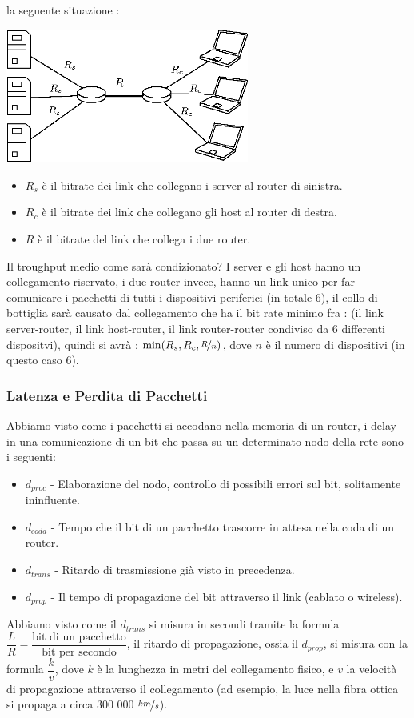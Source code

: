 \documentclass[12pt, letterpaper]{article}
\begin{document}
la seguente situazione :\begin{center}
    \includegraphics[width=0.6\textwidth ]{images/troughput.eps}
\end{center}\begin{itemize}
    \item $R_s$ è il bitrate dei link che collegano i server al router di sinistra.
    \item $R_c$ è il bitrate dei link che collegano gli host al router di destra.
    \item $R$ è il bitrate del link che collega i due router.
\end{itemize}
Il troughput medio come sarà condizionato? I server e gli host hanno un collegamento riservato, i due router 
invece, hanno un link unico per far comunicare i pacchetti di tutti i dispositivi periferici (in totale 6),
il collo di bottiglia sarà causato dal collegamento che ha il bit rate minimo fra : (il link server-router, il link 
host-router, il link router-router condiviso da 6 differenti dispositvi), quindi si avrà : $\min(R_s,R_c,\nicefrac{R}{n})$, dove 
$n$ è il numero di dispositivi (in questo caso 6).
\subsubsection{Latenza e Perdita di Pacchetti}
Abbiamo visto come i pacchetti si accodano nella memoria di un router, i delay in una comunicazione di un bit 
che passa su un determinato nodo della rete sono i seguenti: 
\begin{itemize}
    \item $d_{proc}$ - Elaborazione del nodo, controllo di possibili errori sul bit, solitamente ininfluente.
    \item $d_{coda}$ - Tempo che il bit di un pacchetto trascorre in attesa nella coda di un router.
    \item $d_{trans}$ - Ritardo di trasmissione già visto in precedenza.
    \item $d_{prop}$ - Il tempo di propagazione del bit attraverso il link (cablato o wireless).
\end{itemize}
Abbiamo visto come il $d_{trans}$ si misura in secondi tramite la formula
 $\dfrac{L}{R}=\dfrac{\text{bit di un pacchetto}}{\text{bit per secondo}}$, il ritardo di propagazione, ossia 
 il $d_{prop}$, si misura con la formula $\dfrac{k}{v}$, dove $k$ è la lunghezza in metri del collegamento 
 fisico, e $v$ la velocità di propagazione attraverso il collegamento (ad esempio, la luce nella fibra ottica 
 si propaga a circa 300 000 $\nicefrac{km}{s}$).
\end{document}
